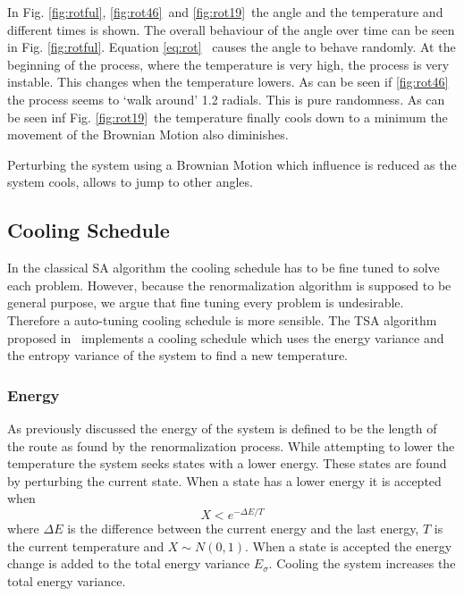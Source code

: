 In Fig. \ref{fig:rotful}, \ref{fig:rot46}~and \ref{fig:rot19}~the angle and
the temperature and different times is shown. The overall behaviour of the
angle over time can be seen in Fig. \ref{fig:rotful}. Equation \ref{eq:rot}~
causes the angle to behave randomly. At the beginning of the process, where
the temperature is very high, the process is very instable. This changes when
the temperature lowers. As can be seen if \ref{fig:rot46} the process seems to
`walk around' 1.2 radials. This is pure randomness. As can be seen inf Fig.
\ref{fig:rot19}~the temperature finally cools down to a minimum the movement
of the Brownian Motion also diminishes.

Perturbing the system using a Brownian Motion which influence is reduced as
the system cools, allows to jump to other angles.

\subsection{Cooling Schedule}
In the classical SA algorithm the cooling schedule has to be fine tuned to
solve each problem. However, because the renormalization algorithm is supposed
to be general purpose, we argue that fine tuning every problem is undesirable.
Therefore a auto-tuning cooling schedule is more sensible. The TSA algorithm
proposed in \cite{devicente2003pts}~implements a cooling schedule which uses
the energy variance and the entropy variance of the system to find a new
temperature. 

\subsubsection{Energy}
As previously discussed the energy of the system is defined to be the length
of the route as found by the renormalization process. While attempting to
lower the temperature the system seeks states with a lower energy. These
states are found by perturbing the current state. When a state has a lower
energy it is accepted when
\begin{equation}\label{eq:accept}
X < e^{-\Delta E / T}
\end{equation}
where $\Delta E$ is the difference between the current energy and the last
energy, $T$ is the current temperature and $X\sim N(0, 1)$. When a state is
accepted the energy change is added to the total energy variance $E_\sigma$.
Cooling the system increases the total energy variance.

